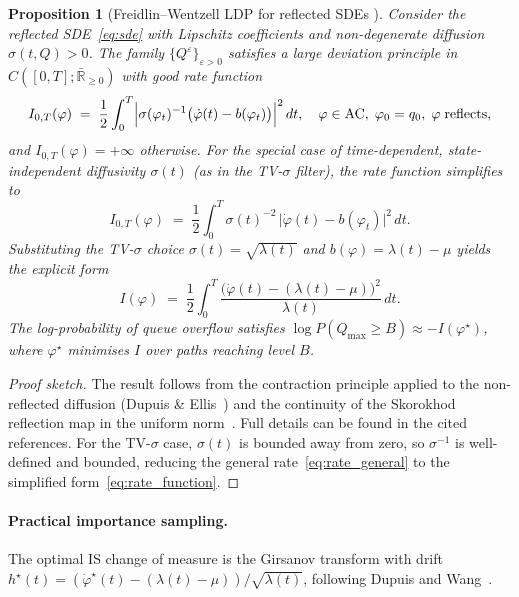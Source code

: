 \documentclass[pdflatex,sn-mathphys-num]{sn-jnl}
\theoremstyle{thmstyleone}%
\newtheorem{proposition}{Proposition}%
\theoremstyle{thmstyletwo}%
\theoremstyle{thmstylethree}%
\begin{document}
\begin{proposition}[Freidlin--Wentzell LDP for reflected SDEs {\cite{dupuis1997large,xu2009large}}]
\label{prop:rate_function}
Consider the reflected SDE~\eqref{eq:sde} with Lipschitz coefficients and
non-degenerate diffusion $\sigma(t,Q) > 0$.  The family $\{Q^\varepsilon\}_{\varepsilon>0}$
satisfies a large deviation principle in $C([0,T];\bar{\mathbb{R}}_{\ge 0})$ with good
rate function
\begin{equation}
    I_{0,T}(\varphi) \;=\; \frac{1}{2}\int_0^T
    \Bigl|\sigma(\varphi_t)^{-1}\bigl(\dot\varphi(t) - b(\varphi_t)\bigr)\Bigr|^2\,dt,
    \quad \varphi \in \mathrm{AC},\;\varphi_0 = q_0,\;\varphi \;\text{reflects},
    \label{eq:rate_general}
\end{equation}
and $I_{0,T}(\varphi) = +\infty$ otherwise.
For the special case of \emph{time-dependent, state-independent} diffusivity $\sigma(t)$
(as in the TV-$\sigma$ filter), the rate function simplifies to
\begin{equation}
    I_{0,T}(\varphi) \;=\; \frac{1}{2}\int_0^T
    \sigma(t)^{-2}\,\bigl|\dot\varphi(t) - b(\varphi_t)\bigr|^2\,dt .
    \label{eq:rate_si}
\end{equation}
Substituting the TV-$\sigma$ choice $\sigma(t) = \sqrt{\lambda(t)}$ and
$b(\varphi) = \lambda(t) - \mu$ yields the explicit form
\begin{equation}
    I(\varphi) \;=\; \frac{1}{2}\int_0^T
    \frac{\bigl(\dot\varphi(t) - (\lambda(t)-\mu)\bigr)^2}{\lambda(t)}\,dt .
    \label{eq:rate_function}
\end{equation}
The log-probability of queue overflow satisfies
$\log P(Q_{\max} \ge B) \approx -I(\varphi^{\star})$, where $\varphi^{\star}$ minimises
$I$ over paths reaching level $B$.
\end{proposition}
\begin{proof}[Proof sketch]
The result follows from the contraction principle applied to the non-reflected diffusion
(Dupuis \& Ellis~\cite{dupuis1997large}) and the continuity of the Skorokhod reflection
map in the uniform norm~\cite{saisho1987stochastic}.  Full details can be found in the
cited references.  For the TV-$\sigma$ case, $\sigma(t)$ is bounded away from zero, so
$\sigma^{-1}$ is well-defined and bounded, reducing the general
rate~\eqref{eq:rate_general} to the simplified form~\eqref{eq:rate_function}.
\end{proof}

\paragraph{Practical importance sampling.}
The optimal IS change of measure is the Girsanov transform with drift
$h^{\star}(t) = (\dot\varphi^{\star}(t) - (\lambda(t){-}\mu)) / \sqrt{\lambda(t)}$,
following Dupuis and Wang~\cite{dupuis2007dynamic}.
\end{document}
